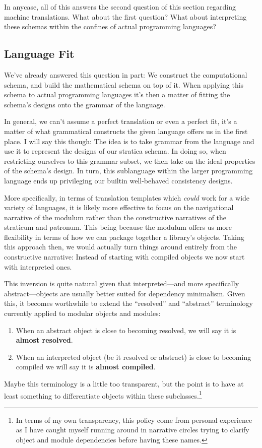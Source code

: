 \documentclass[twoside]{article}
\newcommand{\strong}[1]{{\bfseries #1}}
\begin{document}
In anycase, all of this answers the second question of this section regarding machine translations. What about the first question?
What about interpreting these schemas within the confines of actual programming languages?

\subsection*{Language Fit}

We've already answered this question in part: We construct the computational schema, and build the mathematical schema on
top of it. When applying this schema to actual programming languages it's then a matter of fitting the schema's designs onto
the grammar of the language.

In general, we can't assume a perfect translation or even a perfect fit, it's a matter of what grammatical constructs
the given language offers us in the first place. I will say this though: The idea is to take grammar from the language
and use it to represent the designs of our stratica schema. In doing so, when restricting ourselves to this grammar subset,
we then take on the ideal properties of the schema's design. In turn, this sublanguage within the larger programming
language ends up privileging our builtin well-behaved consistency designs.

More specifically, in terms of translation templates which \emph{could} work for a wide variety of languages, it is likely
more effective to focus on the navigational narrative of the modulum rather than the constructive narratives of the straticum
and patronum. This being because the modulum offers us more flexibility in terms of how we can package together a library's
objects. Taking this approach then, we would actually turn things around entirely from the constructive narrative: Instead
of starting with compiled objects we now start with interpreted ones.

This inversion is quite natural given that interpreted---and more specifically abstract---objects are usually better suited
for dependency minimalism. Given this, it becomes worthwhile to extend the ``resolved'' and ``abstract'' terminology currently
applied to modular objects and modules:
\begin{enumerate}
\item When an abstract object is close to becoming resolved, we will say it is \strong{almost resolved}.
\item When an interpreted object (be it resolved or abstract) is close to becoming compiled we will say it is
      \strong{almost compiled}.
\end{enumerate}
Maybe this terminology is a little too transparent, but the point is to have at least something to differentiate objects within
these subclasses.\footnote{In terms of my own transparency, this policy come from personal experience as I have caught myself
running around in narrative circles trying to clarify object and module dependencies before having these names.}
\end{document}
